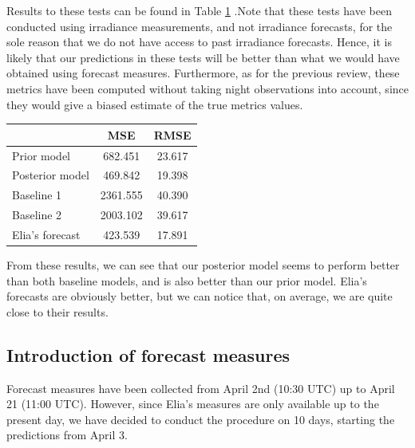 \documentclass[a4paper, 12pt]{article}
\begin{document}
Results to these tests can be found in Table \ref{tab:pv_metrics_meas} .Note that these tests have been conducted using irradiance measurements, and not irradiance forecasts, for the sole reason that we do not have access to past irradiance forecasts. Hence, it is likely that our predictions in these tests will be better than what we would have obtained using forecast measures. Furthermore, as for the previous review, these metrics have been computed without taking night observations into account, since they would give a biased estimate of the true metrics values. 
\begin{table}[h]
	\centering
    \begin{tabular}{l|c|c}
                        & MSE      & RMSE   \\ \hline
        Prior model     & 682.451  & 23.617 \\ \hline
        Posterior model & 469.842  & 19.398 \\ \hline
        Baseline 1      & 2361.555 & 40.390 \\ \hline
        Baseline 2      & 2003.102 & 39.617 \\ \hline
        Elia's forecast & 423.539  & 17.891
    \end{tabular}
    \label{tab:pv_metrics_meas}
\end{table}
From these results, we can see that our posterior model seems to perform better than both baseline models, and is also better than our prior model. Elia's forecasts are obviously better, but we can notice that, on average, we are quite close to their results.

\subsection{Introduction of forecast measures}
Forecast measures have been collected from April 2nd (10:30 UTC) up to April 21 (11:00 UTC). However, since Elia's measures are only available up to the present day, we have decided to conduct the procedure on 10 days, starting the predictions from April 3.
\end{document}
